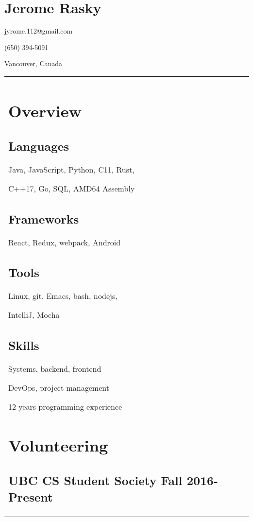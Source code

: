 \documentclass[letterpaper]{article}
\newlength{\leftcol}
\newlength{\rightcol}
\newcommand{\subtitle}{\normalfont\sffamily\color{black}\large}
\begin{document}
\bodyfont
\large
{}

\section*{\Huge\bfseries Jerome Rasky}

jyrome.112@gmail.com

(650) 394-5091

Vancouver, Canada

\begin{tabularx}{\textwidth}{@{}p{\leftcol} p{\rightcol}}
\vspace*{1pt}
\section*{Overview}
\subsection*{Languages}

Java, JavaScript, Python, C11, Rust,

C++17, Go, SQL, AMD64 Assembly

\subsection*{Frameworks}

React, Redux, webpack, Android

\subsection*{Tools}

Linux, git, Emacs, bash, nodejs,

IntelliJ, Mocha

\subsection*{Skills}

Systems, backend, frontend

DevOps, project management

12 years programming experience

\section*{Volunteering}

\subsection*{UBC CS Student Society \newline\subtitle Fall 2016-Present}


\end{tabularx}
\end{document}
